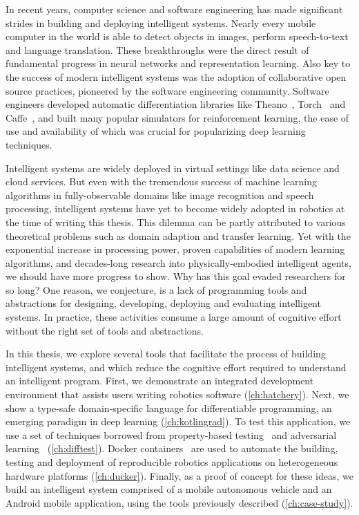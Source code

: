 \documentclass[12pt,initial,twoside,maitrise]{dms}
\numberwithin{equation}{section}
\numberwithin{table}{chapter}
\numberwithin{figure}{chapter}
\begin{document}
In recent years, computer science and software engineering has made significant strides in building and deploying intelligent systems. Nearly every mobile computer in the world is able to detect objects in images, perform speech-to-text and language translation. These breakthroughs were the direct result of fundamental progress in neural networks and representation learning. Also key to the success of modern intelligent systems was the adoption of collaborative open source practices, pioneered by the software engineering community. Software engineers developed automatic differentiation libraries like Theano~\citep{theano}, Torch~\citep{collobert2002torch} and Caffe~\citep{jia2014caffe}, and built many popular simulators for reinforcement learning, the ease of use and availability of which was crucial for popularizing deep learning techniques.

Intelligent systems are widely deployed in virtual settings like data science and cloud services. But even with the tremendous success of machine learning algorithms in fully-observable domains like image recognition and speech processing, intelligent systems have yet to become widely adopted in robotics at the time of writing this thesis. This dilemma can be partly attributed to various theoretical problems such as domain adaption and transfer learning. Yet with the exponential increase in processing power, proven capabilities of modern learning algorithms, and decades-long research into physically-embodied intelligent agents, we should have more progress to show. Why has this goal evaded researchers for so long? One reason, we conjecture, is a lack of programming tools and abstractions for designing, developing, deploying and evaluating intelligent systems. In practice, these activities consume a large amount of cognitive effort without the right set of tools and abstractions.

In this thesis, we explore several tools that facilitate the process of building intelligent systems, and which reduce the cognitive effort required to understand an intelligent program. First, we demonstrate an integrated development environment that assists users writing robotics software (\autoref{ch:hatchery}). Next, we show a type-safe domain-specific language for differentiable programming, an emerging paradigm in deep learning (\autoref{ch:kotlingrad}). To test this application, we use a set of techniques borrowed from property-based testing~\citep{fink1997property} and adversarial learning~\citep{lowd2005adversarial} (\autoref{ch:difftest}). Docker containers~\citep{merkel2014docker} are used to automate the building, testing and deployment of reproducible robotics applications on heterogeneous hardware platforms (\autoref{ch:ducker}). Finally, as a proof of concept for these ideas, we build an intelligent system comprised of a mobile autonomous vehicle and an Android mobile application, using the tools previously described (\autoref{ch:case-study}).
\end{document}
